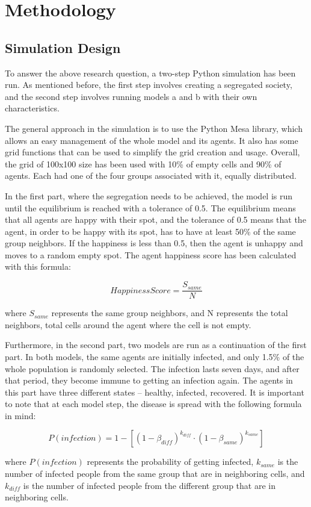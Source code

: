 \documentclass[11pt,a4paper]{article}
\begin{document}
\section{Methodology}
\subsection{Simulation Design}
To answer the above research question, a two-step Python simulation has been run. As mentioned before, the first step involves creating a segregated society, and the second step involves running models a and b with their own characteristics.

The general approach in the simulation is to use the Python Mesa library, which allows an easy management of the whole model and its agents. It also has some grid functions that can be used to simplify the grid creation and usage. Overall, the grid of 100x100 size has been used with 10\% of empty cells and 90\% of agents. Each had one of the four groups associated with it, equally distributed. 

In the first part, where the segregation needs to be achieved, the model is run until the equilibrium is reached with a tolerance of 0.5. The equilibrium means that all agents are happy with their spot, and the tolerance of 0.5 means that the agent, in order to be happy with its spot, has to have at least 50\% of the same group neighbors. If the happiness is less than 0.5, then the agent is unhappy and moves to a random empty spot. The agent happiness score has been calculated with this formula:

\[
HappinessScore = \frac{S_{same}}{N}
\]

where \(S_{same} \) represents the same group neighbors, and N represents the total neighbors, total cells around the agent where the cell is not empty.

Furthermore, in the second part, two models are run as a continuation of the first part. In both models, the same agents are initially infected, and only 1.5\% of the whole population is randomly selected. The infection lasts seven days, and after that period, they become immune to getting an infection again. The agents in this part have three different states – healthy, infected, recovered. It is important to note that at each model step, the disease is spread with the following formula in mind:

\[
P(infection) = 1 - [(1 - \beta_{diff})^{k_{diff}} \cdot (1 - \beta_{same})^{k_{same}}]
\]

where \(P(infection)\) represents the probability of getting infected, \( k_{same} \) is the number of infected people from the same group that are in neighboring cells, and \( k_{diff} \) is the number of infected people from the different group that are in neighboring cells.
\end{document}

